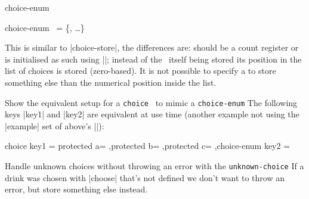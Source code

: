 \begin{function}[module=expkv-def type]{choice-enum}
  \begin{syntax}
    choice-enum \key\ = \{\val, \ldots\} 
  \end{syntax}
  This is similar to |choice-store|, the differences are:  should be a
  count register or is initialised as such using |\newcount|; instead of the
  \val\ itself being stored its position in the list of choices is stored
  (zero-based). It is not possible to specify a  to store
  something else than the numerical position inside the list.
\end{function}
\begin{example}
    {Show the equivalent setup for a \texttt{choice} \type\ to mimic a
    \texttt{choice-enum} \type}
  The following keys |key1| and |key2| are equivalent at use time (another
  example not using the |example| set of above's |\ekvdefinekeys|):
  \begin{enverb}
    \newcount\myc
      {
         choice key1 =
          {
             protected a={ }
            ,protected b={ }
            ,protected c={ }
          }
        ,choice-enum key2 = 
      }
  \end{enverb}
\end{example}

\begin{example}
    {Handle unknown choices without throwing an error with the
    \texttt{unknown-choice} \type}
  If a drink was chosen with |choose| that's not defined we don't want to throw
  an error, but store something else instead.
  \begin{enverb}
        ,protected unknown-choice choose =
          \def\exampledrink{something unavailable}
      }%
  \end{enverb}
\end{example}

